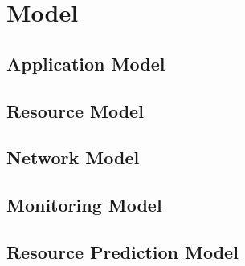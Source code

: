 \chapter{Model} %

\section{Application Model}
\section{Resource Model}
\section{Network Model}
\section{Monitoring Model}
\section{Resource Prediction Model}
